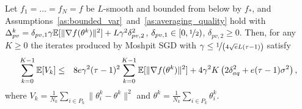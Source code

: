 \begin{lemma}\label{lem:V_k_lemma_non_cvx}
    Let $f_1 = \ldots = f_N = f$ be $L$-smooth and bounded from below by $f_*$, and Assumptions~\ref{as:bounded_var}~and~\ref{as:averaging_quality} hold with $\Delta_{pv}^k = \delta_{pv,1}\gamma\mathbb{E}[\|\nabla f(\theta^k)\|^2] + L\gamma^2\delta_{pv,2}^2$, $\delta_{pv,1}\in [0,\nicefrac{1}{2})$, $\delta_{pv,2}\ge 0$. Then, for any $K \ge 0$ the iterates produced by Moshpit SGD with $\gamma \le \nicefrac{1}{\left(4\sqrt{e}L(\tau-1)\right)}$ satisfy
    \begin{eqnarray}
        \sum\limits_{k=0}^{K-1}\mathbb{E}[V_k] &\le& 8e\gamma^2(\tau-1)^2\sum\limits_{k=0}^{K-1}\mathbb{E}[\|\nabla f(\theta^k)\|^2] + 4\gamma^2K\left(2\delta_{aq}^2 + e(\tau-1)\sigma^2\right) ,\label{eq:V_k_lemma_non_cvx}
    \end{eqnarray}
    where $V_k = \frac{1}{N_k}\sum_{i\in P_k}\|\theta_i^k - \theta^k\|^2$ and $\theta^k = \frac{1}{N_k}\sum_{i\in P_k}\theta_i^k$.
\end{lemma}
